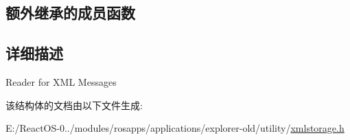 \subsection*{额外继承的成员函数}


\subsection{详细描述}
Reader for X\+ML Messages 

该结构体的文档由以下文件生成\+:\begin{DoxyCompactItemize}
\item 
E\+:/\+React\+O\+S-\/0../modules/rosapps/applications/explorer-\/old/utility/\hyperlink{xmlstorage_8h}{xmlstorage.\+h}\end{DoxyCompactItemize}
